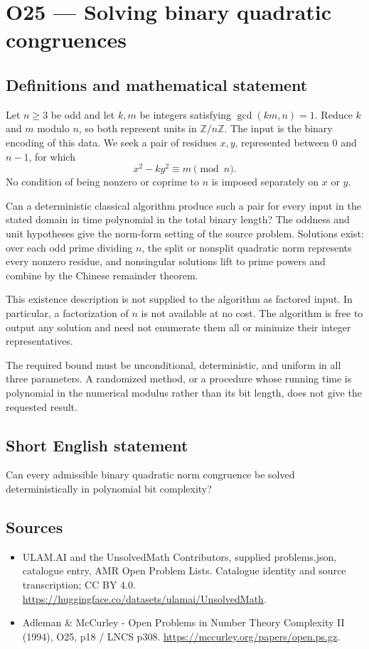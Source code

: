 \documentclass[11pt,a4paper]{article}
\begin{document}
\section*{O25 — Solving binary quadratic congruences}\label{statement}

\subsection{Definitions and mathematical statement}
Let $n\ge3$ be odd and let $k,m$ be integers satisfying $\gcd(km,n)=1$. Reduce $k$ and $m$ modulo $n$, so both represent units in $\mathbb Z/n\mathbb Z$. The input is the binary encoding of this data. We seek a pair of residues $x,y$, represented between $0$ and $n-1$, for which
\[
x^2-ky^2\equiv m\pmod n.
\]
No condition of being nonzero or coprime to $n$ is imposed separately on $x$ or $y$.

Can a deterministic classical algorithm produce such a pair for every input in the stated domain in time polynomial in the total binary length? The oddness and unit hypotheses give the norm-form setting of the source problem. Solutions exist: over each odd prime dividing $n$, the split or nonsplit quadratic norm represents every nonzero residue, and nonsingular solutions lift to prime powers and combine by the Chinese remainder theorem.

This existence description is not supplied to the algorithm as factored input. In particular, a factorization of $n$ is not available at no cost. The algorithm is free to output any solution and need not enumerate them all or minimize their integer representatives.

The required bound must be unconditional, deterministic, and uniform in all three parameters. A randomized method, or a procedure whose running time is polynomial in the numerical modulus rather than its bit length, does not give the requested result.
\subsection{Short English statement}
Can every admissible binary quadratic norm congruence be solved deterministically in polynomial bit complexity?
\subsection{Sources}
\begin{itemize}
\item[S1] ULAM.AI and the UnsolvedMath Contributors, supplied problems.json, catalogue entry, AMR Open Problem Lists. Catalogue identity and source transcription; CC BY 4.0.
\url{https://huggingface.co/datasets/ulamai/UnsolvedMath}.
\item[S2] Adleman \& McCurley - Open Problems in Number Theory Complexity II (1994), O25, p18 / LNCS p308. 
\url{https://mccurley.org/papers/open.ps.gz}.
\end{itemize}
\end{document}
